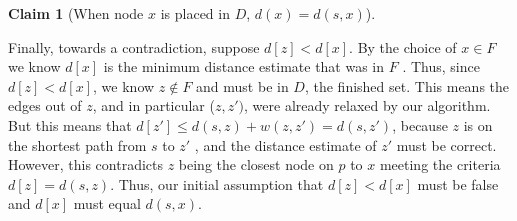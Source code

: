\documentclass [12pt]{article}
\theoremstyle{definition}
\newtheorem{claim}{Claim}
\begin{document}
\begin{claim}[When node $x$ is placed in $D$, $d(x) = d(s,x)$]
\begin{enumerate}
    Finally, towards a contradiction, suppose $d[z] < d[x]$. By the choice of $x \in F$ we know $d[x]$ is the minimum distance estimate that was in $F$ . Thus, since $d[z] < d[x]$, we know $z \notin F$ and must be in $D$, the finished set. This means the edges out of $z$, and in particular ($z, z' )$, were already relaxed by our algorithm. But this means that $d[z ' ] \leq d(s, z) + w(z, z' ) = d(s, z' )$, because $z$ is on the shortest path from $s$ to $z '$ , and the distance estimate of $z '$ must be correct. However, this contradicts $z$ being the closest node on $p$ to $x$ meeting the criteria$ d[z] = d(s, z)$. Thus, our initial assumption that $d[z] < d[x]$ must be false and $d[x]$ must equal $d(s, x)$.
\end{enumerate}
\end{claim}
\end{document}
